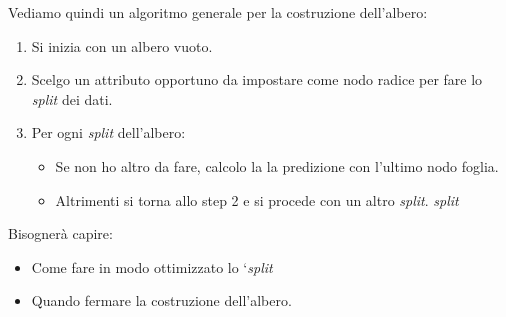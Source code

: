 Vediamo quindi un algoritmo generale per la costruzione dell'albero:
\begin{enumerate}
  \item Si inizia con un albero vuoto.
  \item Scelgo un attributo opportuno da impostare come nodo radice per fare lo \textit{split} dei dati.
  \item Per ogni \textit{split} dell'albero:
  \begin{itemize}
    \item Se non ho altro da fare, calcolo la la predizione con l'ultimo nodo foglia.
    \item Altrimenti si torna allo step 2 e si procede con un altro \textit{split}.
    \textit{split}
  \end{itemize}
\end{enumerate}
Bisognerà capire:
\begin{itemize}
  \item Come fare in modo ottimizzato lo `\textit{split}
  \item Quando fermare la costruzione dell'albero.
\end{itemize}
